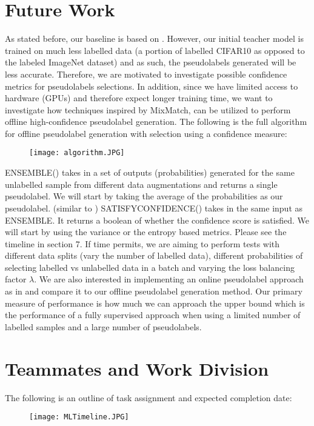 \documentclass{article}
\begin{document}
\section{Future Work}
As stated before, our baseline is based on \cite{xie2019selftraining}. However, our initial teacher model is trained on much less labelled data (a portion of labelled CIFAR10 as opposed to the labeled ImageNet dataset) and as such, the pseudolabels generated will be less accurate. Therefore, we are motivated to investigate possible confidence metrics for pseudolabels selections. In addition, since we have limited access to hardware (GPUs) and therefore expect longer training time, we want to investigate how techniques inspired by MixMatch, can be utilized to perform offline high-confidence pseudolabel generation. The following is the full algorithm for offline pseudolabel generation with selection using a confidence measure: 
\begin{figure}[H]
\vspace*{-7mm}
\texttt{[image: algorithm.JPG]}
\vspace*{-7mm}
\end{figure}
ENSEMBLE() takes in a set of outputs (probabilities) generated for the same unlabelled sample from different data augmentations and returns a single pseudolabel. We will start by taking the average of the probabilities as our pseudolabel. (similar to \cite{Berthelot2019MixMatch:Learning})
SATISFYCONFIDENCE() takes in the same input as ENSEMBLE. It returns a boolean of whether the confidence score is satisfied. We will start by using the variance or the entropy based metrics. Please see the timeline in section 7. If time permits, we are aiming to perform tests with different data splits (vary the number of labelled data), different probabilities of selecting labelled vs unlabelled data in a batch and varying the loss balancing factor $\lambda$. We are also interested in implementing an online pseudolabel approach as in \cite{Berthelot2019MixMatch:Learning} and compare it to our offline pseudolabel generation method. Our primary measure of performance is how much we can approach the upper bound which is the performance of a fully supervised approach when using a limited number of labelled samples and a large number of pseudolabels.
\section{Teammates and Work Division}
The following is an outline of task assignment and expected completion date:

\begin{figure}[H]
\vspace*{-4mm}
\texttt{[image: MLTimeline.JPG]}
\vspace*{-5mm}
\end{figure}


\end{document}
